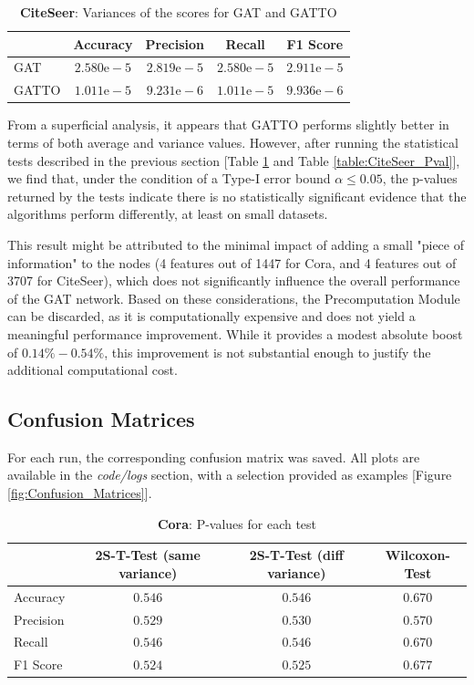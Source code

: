 \documentclass[12pt,conference]{ieeeconf} %
\begin{document}
\begin{table}[h!]
    \centering 
    \begin{tabular}{|l|c|c|c|c|} 
    \hline
     & Accuracy & Precision & Recall & F1 Score \\ \hline
    GAT &$2.580\text{e}-5$ &$2.819\text{e}-5$ &$2.580\text{e}-5$ &$2.911\text{e}-5$ \\ \hline
    GATTO &$1.011\text{e}-5$ &$9.231\text{e}-6$ &$1.011\text{e}-5$ &$9.936\text{e}-6$\\ \hline
    \end{tabular}
    \caption{\textbf{CiteSeer}: Variances of the scores for GAT and GATTO}
\end{table}
From a superficial analysis, it appears that GATTO performs slightly better in terms of both average and variance values. However, after running the statistical tests described in the previous section [Table \ref{table:Cora_Pval} and Table \ref{table:CiteSeer_Pval}], we find that, under the condition of a Type-I error bound $\alpha \leq 0.05$, the p-values returned by the tests indicate there is no statistically significant evidence that the algorithms perform differently, at least on small datasets.

This result might be attributed to the minimal impact of adding a small "piece of information" to the nodes (4 features out of 1447 for Cora, and 4 features out of 3707 for CiteSeer), which does not significantly influence the overall performance of the GAT network. Based on these considerations, the Precomputation Module can be discarded, as it is computationally expensive and does not yield a meaningful performance improvement. While it provides a modest absolute boost of $0.14\%-0.54\%$, this improvement is not substantial enough to justify the additional computational cost.

\subsection{Confusion Matrices}
For each run, the corresponding confusion matrix was saved. All plots are available in the \textit{code/logs} section, with a selection provided as examples [Figure \ref{fig:Confusion_Matrices}].
\begin{table}[h!]
    \centering 
    \begin{tabular}{|l|c|c|c|} 
    \hline
     & 2S-T-Test (same variance) & 2S-T-Test (diff variance) & Wilcoxon-Test\\ \hline
    Accuracy &$0.546$ &$0.546$ &$0.670$ \\ \hline
    Precision &$0.529$ &$0.530$ &$0.570$\\ \hline
    Recall &$0.546$ &$0.546$ &$0.670$\\ \hline
    F1 Score &$0.524$ &$0.525$ &$0.677$\\ \hline
    \end{tabular}
    \caption{\textbf{Cora}: P-values for each test}
    \label{table:Cora_Pval}
\end{table}
\end{document}
